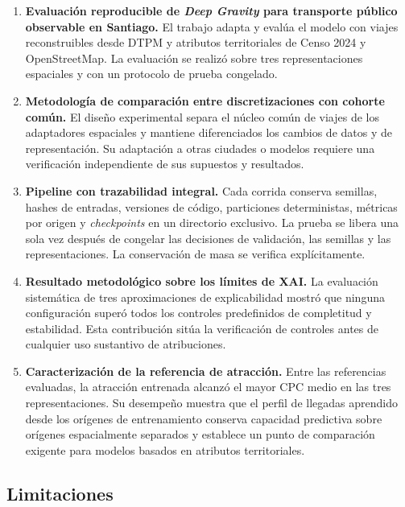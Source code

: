 \begin{enumerate}
    \item \textbf{Evaluación reproducible de \textit{Deep Gravity} para transporte público observable en Santiago.} El trabajo adapta y evalúa el modelo con viajes reconstruibles desde DTPM y atributos territoriales de Censo 2024 y OpenStreetMap. La evaluación se realizó sobre tres representaciones espaciales y con un protocolo de prueba congelado.

    \item \textbf{Metodología de comparación entre discretizaciones con cohorte común.} El diseño experimental separa el núcleo común de viajes de los adaptadores espaciales y mantiene diferenciados los cambios de datos y de representación. Su adaptación a otras ciudades o modelos requiere una verificación independiente de sus supuestos y resultados.

    \item \textbf{Pipeline con trazabilidad integral.} Cada corrida conserva semillas, hashes de entradas, versiones de código, particiones deterministas, métricas por origen y \textit{checkpoints} en un directorio exclusivo. La prueba se libera una sola vez después de congelar las decisiones de validación, las semillas y las representaciones. La conservación de masa se verifica explícitamente.

    \item \textbf{Resultado metodológico sobre los límites de XAI.} La evaluación sistemática de tres aproximaciones de explicabilidad mostró que ninguna configuración superó todos los controles predefinidos de completitud y estabilidad. Esta contribución sitúa la verificación de controles antes de cualquier uso sustantivo de atribuciones.

    \item \textbf{Caracterización de la referencia de atracción.} Entre las referencias evaluadas, la atracción entrenada alcanzó el mayor CPC medio en las tres representaciones. Su desempeño muestra que el perfil de llegadas aprendido desde los orígenes de entrenamiento conserva capacidad predictiva sobre orígenes espacialmente separados y establece un punto de comparación exigente para modelos basados en atributos territoriales.
\end{enumerate}


\subsection{Limitaciones}

